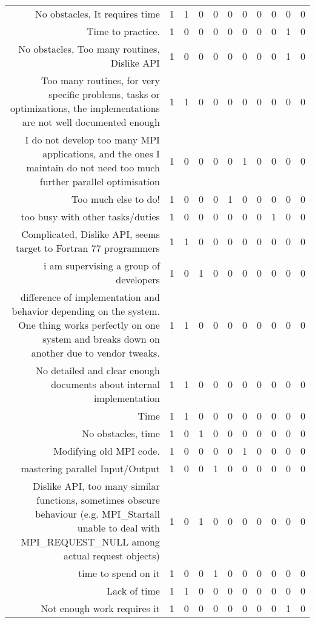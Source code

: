 {\begin{landscape}
\begin{longtable}[htb]{r|c|c|c|c|c|c|c|c|c|c}
{No obstacles, It requires time} & 1 & 1 & 0 & 0 & 0 & 0 & 0 & 0 & 0 & 0 \\%
{Time to practice.} & 1 & 0 & 0 & 0 & 0 & 0 & 0 & 0 & 1 & 0 \\%
{No obstacles, Too many routines, Dislike API} & 1 & 0 & 0 & 0 & 0 & 0 & 0 & 0 & 1 & 0 \\%
{Too many routines, for very specific problems, tasks or optimizations, the implementations are not well documented enough} & 1 & 1 & 0 & 0 & 0 & 0 & 0 & 0 & 0 & 0 \\%
{I do not develop too many MPI applications, and the ones I maintain do not need too much further parallel optimisation} & 1 & 0 & 0 & 0 & 0 & 1 & 0 & 0 & 0 & 0 \\%
{Too much else to do!} & 1 & 0 & 0 & 0 & 1 & 0 & 0 & 0 & 0 & 0 \\%
{too busy with other tasks/duties} & 1 & 0 & 0 & 0 & 0 & 0 & 0 & 1 & 0 & 0 \\%
{Complicated, Dislike API, seems target to Fortran 77 programmers} & 1 & 1 & 0 & 0 & 0 & 0 & 0 & 0 & 0 & 0 \\%
{i am supervising a group of developers} & 1 & 0 & 1 & 0 & 0 & 0 & 0 & 0 & 0 & 0 \\%
{difference of implementation and behavior depending on the system. One thing works perfectly on one system and breaks down on another due to vendor tweaks.} & 1 & 1 & 0 & 0 & 0 & 0 & 0 & 0 & 0 & 0 \\%
{No detailed and clear enough documents about internal implementation} & 1 & 1 & 0 & 0 & 0 & 0 & 0 & 0 & 0 & 0 \\%
{Time} & 1 & 1 & 0 & 0 & 0 & 0 & 0 & 0 & 0 & 0 \\%
{No obstacles, time} & 1 & 0 & 1 & 0 & 0 & 0 & 0 & 0 & 0 & 0 \\%
{Modifying old MPI code.} & 1 & 0 & 0 & 0 & 0 & 1 & 0 & 0 & 0 & 0 \\%
{mastering parallel Input/Output} & 1 & 0 & 0 & 1 & 0 & 0 & 0 & 0 & 0 & 0 \\%
{Dislike API, too many similar functions, sometimes obscure behaviour (e.g. MPI\_Startall unable to deal with MPI\_REQUEST\_NULL among actual request objects)} & 1 & 0 & 1 & 0 & 0 & 0 & 0 & 0 & 0 & 0 \\%
{time to spend on it} & 1 & 0 & 0 & 1 & 0 & 0 & 0 & 0 & 0 & 0 \\%
{Lack of time} & 1 & 1 & 0 & 0 & 0 & 0 & 0 & 0 & 0 & 0 \\%
{Not enough work requires it} & 1 & 0 & 0 & 0 & 0 & 0 & 0 & 0 & 1 & 0 \\%

\end{longtable}
\end{landscape}}
